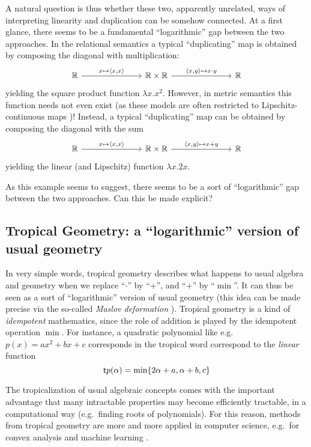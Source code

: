\documentclass[conference]{IEEEtran}
\begin{document}
A natural question is thus whether these two, apparently unrelated, ways of interpreting linearity and duplication can be somehow connected. At a first glance, there seems to be a fundamental ``logarithmic'' gap between the two approaches.
In the relational semantics a typical ``duplicating'' map is obtained by composing the diagonal with multiplication:
$$
\begin{tikzcd}
\mathbb R \ar{rrr}{x\mapsto \langle x, x\rangle}
 & &  &
 \mathbb R\times \mathbb R 
 \ar{rrr}{\langle x,y\rangle \mapsto x\cdot y}
 & & & \mathbb R
\end{tikzcd}
$$
yielding the square product function $\lambda x.x^{2}$.
However, in metric semantics this function needs not even exist (as these models are often restricted to Lipschitz-continuous maps \cite{Gabo2017})! Instead, a typical ``duplicating'' map can be obtained by composing the diagonal with the sum 
$$
\begin{tikzcd}
\mathbb R \ar{rrr}{x\mapsto \langle x, x\rangle}
 & &  &
 \mathbb R\times \mathbb R 
 \ar{rrr}{\langle x,y\rangle \mapsto x+y}
 & & & \mathbb R
\end{tikzcd}
$$
yielding the linear (and Lipschitz) function $\lambda x.2x$.

As this example seems to suggest, there seems to be a sort of ``logarithmic'' gap between the two approaches. Can this be made explicit?



\subsection{Tropical Geometry: a ``logarithmic'' version of usual geometry} 

In very simple words, tropical geometry describes what happens to usual algebra and geometry when we replace ``$\cdot$'' by  ``$+$'', and ``$+$'' by ``$\min$''. It can thus be seen as a sort of ``logarithmic'' version of usual geometry (this idea can be made precise via the so-called \emph{Maslov deformation} \cite{}).
Tropical geometry is a kind of \emph{idempotent} mathematics, since the role of addition is 
played by the idempotent operation $\min$.
For instance, a quadratic polynomial like e.g.~$p(x)=ax^{2}+bx+c$ corresponds in the tropical word correspond to the \emph{linear} function
$$
\mathsf{t} p(\alpha)=\min\{2\alpha + a, \alpha+b, c\}
$$ 

The tropicalization of usual algebraic concepts comes with the important advantage that many intractable properties may become efficiently tractable, in a computational way (e.g.~finding roots of polynomials). For this reason, methods from tropical geometry are more and more applied in computer science, e.g.~for convex analysis and machine learning \cite{}.
\end{document}
